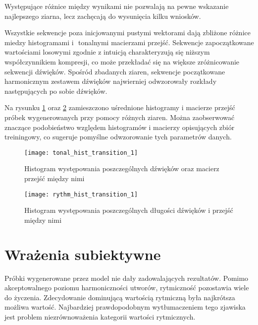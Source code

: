 {{        Występujące różnice między wynikami nie pozwalają na pewne wskazanie najlepszego ziarna, lecz 
        zachęcają do wysunięcia kilku wniosków.

        Wszystkie sekwencje poza inicjowanymi pustymi wektorami dają zbliżone różnice miedzy histogramami i\,\,
        tonalnymi macierzami przejść. 
        Sekwencje zapoczątkowane wartościami losowymi zgodnie z\,\,intuicją charakteryzują się niższym współczynnikiem
        kompresji, co może przekładać się na większe zróżnicowanie sekwencji dźwięków.
        Spośród zbadanych ziaren, sekwencje początkowane harmonicznym zestawem dźwięków najwierniej
        odwzorowały rozkłady następujących po sobie dźwięków.

        \bigskip
        
        Na rysunku \ref{tonal_hist_transition_1} oraz \ref{rythm_hist_transition_1} zamieszczono uśrednione 
        histogramy i\,\,macierze przejść próbek wygenerowanych przy pomocy różnych ziaren. 
        Można zaobserwować znaczące podobieństwo względem histogramów i macierzy opisujących zbiór treiningowy, co sugeruje pomyślne odwzorowanie tych parametrów danych.

        \begin{figure}
            \centering
            \texttt{[image: tonal\_hist\_transition\_1]}
            \caption{Histogram występowania poszczególnych dźwięków oraz macierz przejść między nimi}
            \label{tonal_hist_transition_1}
        \end{figure}

        \begin{figure}
            \centering
            \texttt{[image: rythm\_hist\_transition\_1]}
            \caption{Histogram występowania poszczególnych długości dźwięków i\,\,przejść między nimi}
            \label{rythm_hist_transition_1}
        \end{figure}
    }

    \section{Wrażenia subiektywne}
    {
        Próbki wygenerowane przez model nie dały zadowalających rezultatów. Pomimo akceptowalnego poziomu 
        harmoniczności utworów, rytmiczność pozostawia wiele do życzenia. Zdecydowanie dominującą wartością 
        rytmiczną była najkrótsza możliwa wartość. Najbardziej prawdopodobnym wytłumaczeniem tego zjawiska jest 
        problem niezrównoważenia kategorii wartości rytmicznych. 

}}
